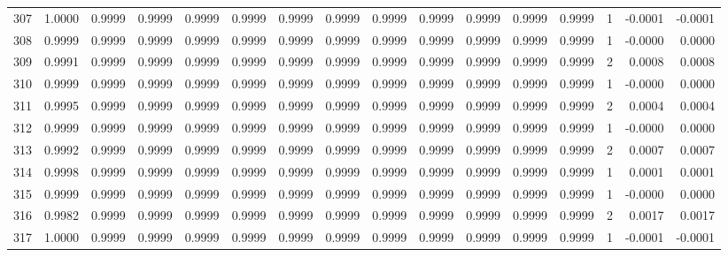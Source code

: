 \begin{tabular}{lrrrrrrrrrrrrrrr}
307 &      1.0000 &  0.9999 &  0.9999 &  0.9999 &  0.9999 &  0.9999 &  0.9999 &  0.9999 &  0.9999 &  0.9999 &   0.9999 &     0.9999 &      1 &                   -0.0001 &                    -0.0001 \\
308 &      0.9999 &  0.9999 &  0.9999 &  0.9999 &  0.9999 &  0.9999 &  0.9999 &  0.9999 &  0.9999 &  0.9999 &   0.9999 &     0.9999 &      1 &                   -0.0000 &                     0.0000 \\
309 &      0.9991 &  0.9999 &  0.9999 &  0.9999 &  0.9999 &  0.9999 &  0.9999 &  0.9999 &  0.9999 &  0.9999 &   0.9999 &     0.9999 &      2 &                    0.0008 &                     0.0008 \\
310 &      0.9999 &  0.9999 &  0.9999 &  0.9999 &  0.9999 &  0.9999 &  0.9999 &  0.9999 &  0.9999 &  0.9999 &   0.9999 &     0.9999 &      1 &                   -0.0000 &                     0.0000 \\
311 &      0.9995 &  0.9999 &  0.9999 &  0.9999 &  0.9999 &  0.9999 &  0.9999 &  0.9999 &  0.9999 &  0.9999 &   0.9999 &     0.9999 &      2 &                    0.0004 &                     0.0004 \\
312 &      0.9999 &  0.9999 &  0.9999 &  0.9999 &  0.9999 &  0.9999 &  0.9999 &  0.9999 &  0.9999 &  0.9999 &   0.9999 &     0.9999 &      1 &                   -0.0000 &                     0.0000 \\
313 &      0.9992 &  0.9999 &  0.9999 &  0.9999 &  0.9999 &  0.9999 &  0.9999 &  0.9999 &  0.9999 &  0.9999 &   0.9999 &     0.9999 &      2 &                    0.0007 &                     0.0007 \\
314 &      0.9998 &  0.9999 &  0.9999 &  0.9999 &  0.9999 &  0.9999 &  0.9999 &  0.9999 &  0.9999 &  0.9999 &   0.9999 &     0.9999 &      1 &                    0.0001 &                     0.0001 \\
315 &      0.9999 &  0.9999 &  0.9999 &  0.9999 &  0.9999 &  0.9999 &  0.9999 &  0.9999 &  0.9999 &  0.9999 &   0.9999 &     0.9999 &      1 &                   -0.0000 &                     0.0000 \\
316 &      0.9982 &  0.9999 &  0.9999 &  0.9999 &  0.9999 &  0.9999 &  0.9999 &  0.9999 &  0.9999 &  0.9999 &   0.9999 &     0.9999 &      2 &                    0.0017 &                     0.0017 \\
317 &      1.0000 &  0.9999 &  0.9999 &  0.9999 &  0.9999 &  0.9999 &  0.9999 &  0.9999 &  0.9999 &  0.9999 &   0.9999 &     0.9999 &      1 &                   -0.0001 &                    -0.0001 \\

\end{tabular}
